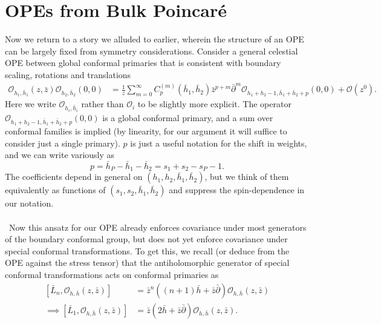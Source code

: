 \documentclass[11pt,letterpaper]{article}
\newcommand{\LP}{\left(}
\newcommand{\RP}{\right)}
\newcommand{\mc}[1]{\mathcal{#1}}
\newcommand{\D}{\partial}
\begin{document}
\section{OPEs from Bulk Poincar\'{e}}
Now we return to a story we alluded to earlier, wherein the structure of an OPE can be largely fixed from symmetry considerations. Consider a general celestial OPE between global conformal primaries that is consistent with boundary scaling, rotations and translations  
\begin{equation}\label{single-single-ansatz}
\begin{aligned}
\mc{O}_{h_1, \bar{h}_1} (z, \bar{z}) \mc{O}_{h_2, \bar{h}_2} (0, 0) & = \frac{1}{z}  \sum_{m=0}^\infty C_p^{(m)}(\bar{h}_1, \bar{h}_2) \bar{z}^{p + m} \bar{\D}^m \mc{O}_{h_1+h_2-1, \bar{h}_1+\bar{h}_2+p}(0,0)  + \mc{O} \LP z^0 \RP.
\end{aligned}
\end{equation}
Here we write $\mc{O}_{h_i, \bar{h}_i}$ rather than $\mc{O}_i$ to be slightly more explicit. The operator $\mc{O}_{h_1+h_2-1, \bar{h}_1+\bar{h}_2+p}(0,0)$ is a global conformal primary, and a sum over conformal families is implied (by linearity, for our argument it will suffice to consider just a single primary). $p$ is just a useful notation for the shift in weights, and we can write variously as\begin{equation}
p = \bar{h}_P - \bar{h}_1 - \bar{h}_2 = s_1 + s_2 - s_P - 1.
\end{equation}
The coefficients depend in general on $(h_1, h_2, \bar{h}_1, \bar{h}_2)$, but we think of them equivalently as functions of $(s_1, s_2, \bar{h}_1, \bar{h}_2)$ and suppress the spin-dependence in our notation.\\
\\
\
Now this ansatz for our OPE already enforces covariance under most generators of the boundary conformal group, but does not yet enforce covariance under special conformal transformations. To get this, we recall (or deduce from the OPE against the stress tensor) that the antiholomorphic generator of special conformal transformations acts on conformal primaries as \begin{equation}
\begin{aligned}
\left[ \bar{L}_n, \mc{O}_{h, \bar{h}}(z, \bar{z}) \right] & = \bar{z}^n \LP(n+1) \bar{h} + \bar{z} \bar{\D} \RP \mc{O}_{h, \bar{h}}(z, \bar{z}) \\
\implies \left[ \bar{L}_1, \mc{O}_{h, \bar{h}}(z, \bar{z}) \right] & = \bar{z} \LP 2 \bar{h} + \bar{z} \bar{\D} \RP \mc{O}_{h, \bar{h}}(z, \bar{z}).
\end{aligned}
\end{equation}
\end{document}
